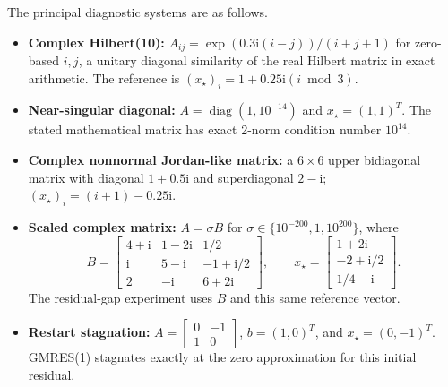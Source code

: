 The principal diagnostic systems are as follows.
\begin{itemize}
    \item \textbf{Complex Hilbert(10):}
    $A_{ij}=\exp(0.3\mathrm{i}(i-j))/(i+j+1)$ for zero-based $i,j$, a unitary
    diagonal similarity of the real Hilbert matrix in exact arithmetic. The reference is
    $(x_\star)_i=1+0.25\mathrm{i}(i\bmod 3)$.
    \item \textbf{Near-singular diagonal:}
    $A=\operatorname{diag}(1,10^{-14})$ and $x_\star=(1,1)^T$. The stated
    mathematical matrix has exact 2-norm condition number $10^{14}$.
    \item \textbf{Complex nonnormal Jordan-like matrix:} a $6\times6$ upper
    bidiagonal matrix with diagonal $1+0.5\mathrm{i}$ and superdiagonal
    $2-\mathrm{i}$; $(x_\star)_i=(i+1)-0.25\mathrm{i}$.
    \item \textbf{Scaled complex matrix:} $A=\sigma B$ for
    $\sigma\in\{10^{-200},1,10^{200}\}$, where
    \begin{equation}
        B=\begin{bmatrix}
            4+\mathrm{i}&1-2\mathrm{i}&1/2\\
            \mathrm{i}&5-\mathrm{i}&-1+\mathrm{i}/2\\
            2&-\mathrm{i}&6+2\mathrm{i}
        \end{bmatrix},\qquad
        x_\star=\begin{bmatrix}1+2\mathrm{i}\\-2+\mathrm{i}/2\\1/4-\mathrm{i}\end{bmatrix}.
    \end{equation}
    The residual-gap experiment uses $B$ and this same reference vector.
    \item \textbf{Restart stagnation:}
    $A=\left[\begin{smallmatrix}0&-1\\1&0\end{smallmatrix}\right]$,
    $b=(1,0)^T$, and $x_\star=(0,-1)^T$. GMRES(1) stagnates exactly at the zero
    approximation for this initial residual.
\end{itemize}

